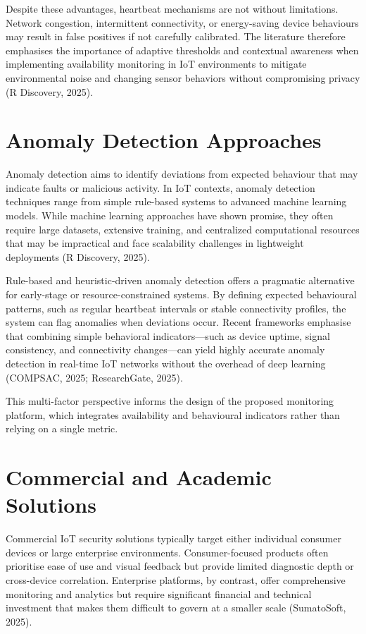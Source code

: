 Despite these advantages, heartbeat mechanisms are not without limitations. Network congestion, intermittent connectivity, or energy-saving device behaviours may result in false positives if not carefully calibrated. The literature therefore emphasises the importance of adaptive thresholds and contextual awareness when implementing availability monitoring in IoT environments to mitigate environmental noise and changing sensor behaviors without compromising privacy (R Discovery, 2025).

\section{Anomaly Detection Approaches}

Anomaly detection aims to identify deviations from expected behaviour that may indicate faults or malicious activity. In IoT contexts, anomaly detection techniques range from simple rule-based systems to advanced machine learning models. While machine learning approaches have shown promise, they often require large datasets, extensive training, and centralized computational resources that may be impractical and face scalability challenges in lightweight deployments (R Discovery, 2025).

Rule-based and heuristic-driven anomaly detection offers a pragmatic alternative for early-stage or resource-constrained systems. By defining expected behavioural patterns, such as regular heartbeat intervals or stable connectivity profiles, the system can flag anomalies when deviations occur. Recent frameworks emphasise that combining simple behavioral indicators---such as device uptime, signal consistency, and connectivity changes---can yield highly accurate anomaly detection in real-time IoT networks without the overhead of deep learning (COMPSAC, 2025; ResearchGate, 2025).

This multi-factor perspective informs the design of the proposed monitoring platform, which integrates availability and behavioural indicators rather than relying on a single metric.

\section{Commercial and Academic Solutions}

Commercial IoT security solutions typically target either individual consumer devices or large enterprise environments. Consumer-focused products often prioritise ease of use and visual feedback but provide limited diagnostic depth or cross-device correlation. Enterprise platforms, by contrast, offer comprehensive monitoring and analytics but require significant financial and technical investment that makes them difficult to govern at a smaller scale (SumatoSoft, 2025).

